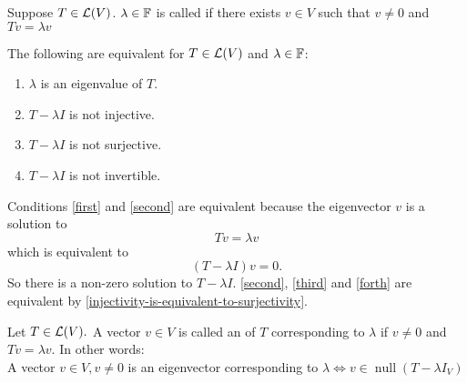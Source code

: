 \begin{mydef} [eigenvalue]
  Suppose $T\in \mathcal{L} (V)$. $\lambda \in \mathbb{F}$ is called  if there exists $v \in V$ such that $v \neq 0$ and $Tv = \lambda v$
\end{mydef}

\setcounter{thm}{6}
\begin{thm} 
  \label{thm: equivalent conditions to be an eigenvalue}
  The following are equivalent for $T \in \mathcal{L}(V)$ and $\lambda \in \mathbb{F}$:
  \begin{enumerate}[label=(\alph*)]
    \item $\lambda$ is an eigenvalue of $T$. \label{first}
    \item $T-\lambda I$ is not injective. \label{second}
    \item $T-\lambda I$ is not surjective. \label{third}
    \item $T-\lambda I$ is not invertible. \label{forth}
  \end{enumerate}
\end{thm}
\begin{prf}
  Conditions \ref{first} and \ref{second} are equivalent because the eigenvector $v$ is a solution to
  \begin{equation}
    Tv=\lambda v
  \end{equation} which is equivalent to
  \begin{equation}
    (T-\lambda I)v=0.
  \end{equation} So there is a non-zero solution to $T-\lambda I$.
  \ref{second}, \ref{third} and \ref{forth} are equivalent by \ref{injectivity-is-equivalent-to-surjectivity}.
\end{prf}

\setcounter{thm}{7}
\begin{mydef} [eigenvector]
  Let $T\in \mathcal{L}(V).$ A vector $v \in V$ is called an  of $T$ corresponding to $\lambda$ if $v\neq 0$ and $Tv = \lambda v$.
  In other words:
  \\A vector $v\in V, v \neq 0$ is an eigenvector corresponding to $\lambda \iff v \in \operatorname{null}(T-\lambda I_V)$
\end{mydef}

